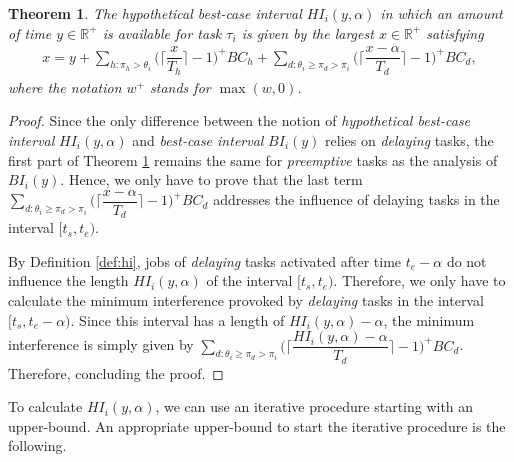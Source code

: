 \documentclass[fleqn]{article}
\newtheorem{theorem}{Theorem}
\begin{document}

\begin{theorem} \label{thrm:hi}
	The \textit{hypothetical best-case interval} $HI_i(y, \alpha)$ in which an amount of time $y\in \mathbb{R^+}$ is available for task $\tau_i$ is given by the largest $x \in \mathbb{R}^+$ satisfying
	\begin{align}
	x = y + \sum\limits_{h:\pi_h > \theta_i} \Big( \Big\lceil  \dfrac{x}{T_h}\Big\rceil -1 \Big)^+  BC_h + \sum\limits_{d:\theta_i \geq \pi_d > \pi_i} \Big( \Big\lceil  \dfrac{x-\alpha}{T_d}\Big\rceil -1 \Big)^+  BC_d,
	\end{align}
	where the notation $w^+$ stands for $\max(w,0)$.
\end{theorem}

\begin{proof}
	Since the only difference between the notion of \textit{hypothetical best-case interval}  $HI_i(y, \alpha)$ and \textit{best-case interval}  $BI_i(y)$ relies on \textit{delaying} tasks, the first part of Theorem \ref{thrm:hi} remains the same for \textit{preemptive} tasks as the analysis of $BI_i(y)$. Hence, we only have to prove that the last term $\sum\limits_{d:\theta_i \geq \pi_d > \pi_i} \Big( \Big\lceil  \dfrac{x-\alpha}{T_d}\Big\rceil -1 \Big)^+  BC_d$ addresses the influence of delaying tasks in the interval $[t_s,t_e)$.
	
	By Definition \ref{def:hi}, jobs of \textit{delaying} tasks activated after time $t_e-\alpha$ do not influence the length $HI_i(y, \alpha)$ of the interval $[t_s,t_e)$. Therefore, we only have to calculate the minimum interference provoked by \textit{delaying} tasks in the interval $[t_s,t_e-\alpha)$. Since this interval has a length of  $HI_i(y, \alpha)-\alpha$, the minimum interference is simply given by  $\sum\limits_{d:\theta_i \geq \pi_d > \pi_i} \Big( \Big\lceil  \dfrac{HI_i(y, \alpha)-\alpha}{T_d}\Big\rceil -1 \Big)^+  BC_d$. Therefore, concluding the proof.
\end{proof}

To calculate $HI_i(y, \alpha)$, we can use an iterative procedure starting with an upper-bound. An appropriate upper-bound to start the iterative procedure is the following.
\end{document}
